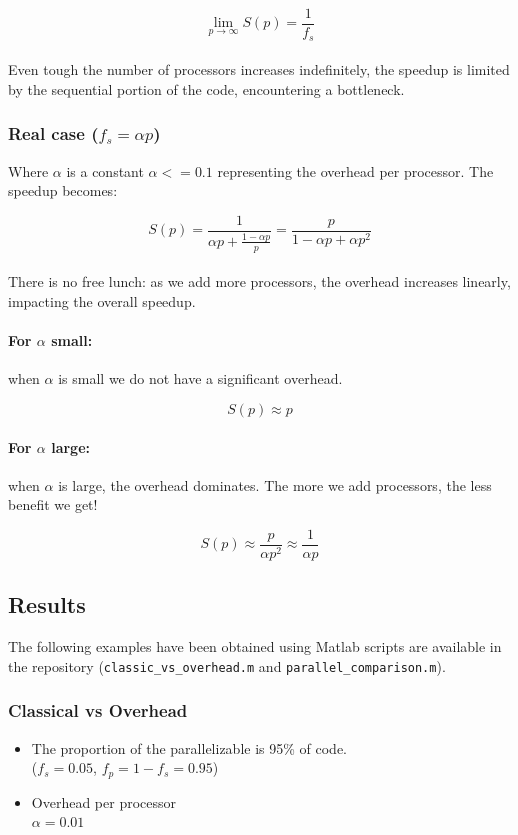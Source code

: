 \[
\lim_{p \to \infty} S(p) = \frac{1}{f_s}
\]
\\
Even tough the number of processors increases indefinitely, the speedup is limited by the sequential portion of the code, encountering a bottleneck.

\subsubsection*{Real case \texorpdfstring{ ($f_s=\alpha p$)}{ (fs=ap)}}
Where $\alpha$ is a constant $\alpha <= 0.1$ representing the overhead per processor. The speedup becomes:

\[
S(p) = \frac{1}{\alpha p + \frac{1 - \alpha p}{p}} = \frac{p}{1 - \alpha p + \alpha p^2}
\]
\\
There is no free lunch: as we add more processors, the overhead increases linearly, impacting the overall speedup.

\paragraph{For $\alpha$ small:} when $\alpha$ is small we do not have a significant overhead.

\[
S(p) \approx p
\]

\paragraph{For $\alpha$ large:} when $\alpha$ is large, the overhead dominates. The more we add processors, the less benefit we get!

\[
S(p) \approx \frac{p}{\alpha p^2} \approx \frac{1}{\alpha p}
\]


\subsection{Results}
The following examples have been obtained using Matlab scripts are available in the repository (\texttt{classic\_vs\_overhead.m} and \texttt{parallel\_comparison.m}).

\subsubsection*{Classical vs Overhead}
\begin{itemize}
    \item The proportion of the parallelizable is 95\% of code.\\
    ($f_s=0.05$, $f_p = 1-f_s = 0.95$)
    \item Overhead per processor\\
    $\alpha = 0.01$
\end{itemize}


